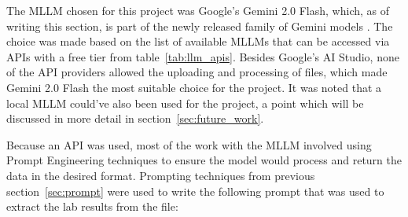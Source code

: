 The MLLM chosen for this project was Google's Gemini 2.0 Flash, which, as of writing this section, is part of the newly released family of Gemini models \parencite{gemini2}\@. The choice was made based on the list of available MLLMs that can be accessed via APIs with a free tier from table~\ref{tab:llm_apis}. Besides Google's AI Studio, none of the API providers allowed the uploading and processing of files, which made Gemini 2.0 Flash the most suitable choice for the project. It was noted that a local MLLM could've also been used for the project, a point which will be discussed in more detail in section~\ref{sec:future_work}.

Because an API was used, most of the work with the MLLM involved using Prompt Engineering techniques to ensure the model would process and return the data in the desired format. Prompting techniques from previous section~\ref{sec:prompt} were used to write the following prompt that was used to extract the lab results from the file:


